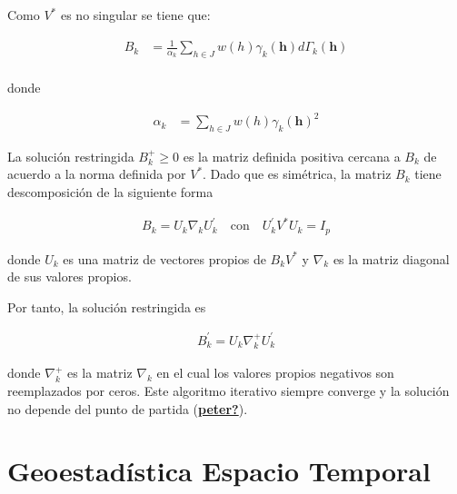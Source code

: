 \documentclass[
]{book}
\begin{document}
Como \(V^{*}\) es no singular se tiene que:

\begin{align}
    B_k&=\frac{1}{\alpha_k}\sum_{h\in J}w(h)\gamma_k(\textbf{h})d\Gamma_k(\textbf{h})\\
\end{align}

donde

\begin{align}
    \alpha_k&=\sum_{h\in J}w(h)\gamma_k(\textbf{h})^2
\end{align}

La solución restringida \(B_k^{+} \geq 0\) es la matriz definida positiva cercana a \(B_k\) de acuerdo a la norma definida por \(V^{*}\). Dado que es simétrica, la matriz \(B_k\) tiene descomposición de la siguiente forma

\begin{align}
    B_k=U_k\nabla_k U_k^{'}\quad \text{con} \quad U_k^{'}V^{*}U_k=I_p
\end{align}

donde \(U_k\) es una matriz de vectores propios de \(B_kV^{*}\) y \(\nabla_k\) es la matriz diagonal de sus valores propios.

Por tanto, la solución restringida es

\begin{align}
    B_k^{'}=U_k\nabla_k^{+}U_k^{'}
\end{align}

donde \(\nabla_k^{+}\) es la matriz \(\nabla_k\) en el cual los valores propios negativos son reemplazados por ceros. Este algoritmo iterativo siempre converge y la solución no depende del punto de partida (\protect\hyperlink{ref-peter}{\textbf{peter?}}).

\hypertarget{geoestaduxedstica-espacio-temporal}{%
\section{Geoestadística Espacio Temporal}\label{geoestaduxedstica-espacio-temporal}}
\end{document}

